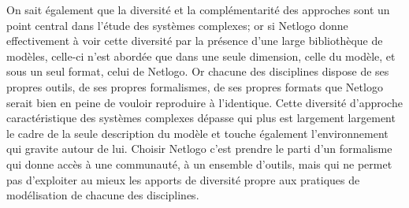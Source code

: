 On sait également que la diversité et la complémentarité des approches sont un point central dans l'étude des systèmes complexes; or si Netlogo donne effectivement à voir cette diversité par la présence d'une large bibliothèque de modèles, celle-ci n'est abordée que dans une seule dimension, celle du modèle, et sous un seul format, celui de Netlogo. Or chacune des disciplines dispose de ses propres outils, de ses propres formalismes, de ses propres formats que Netlogo serait bien en peine de vouloir reproduire à l'identique. Cette diversité d'approche caractéristique des systèmes complexes dépasse qui plus est largement largement le cadre de la seule description du modèle et touche également l'environnement qui gravite autour de lui. Choisir Netlogo c'est prendre le parti d'un formalisme qui donne accès à une communauté, à un ensemble d'outils, mais qui ne permet pas d'exploiter au mieux les apports de diversité propre aux pratiques de modélisation de chacune des disciplines. 

